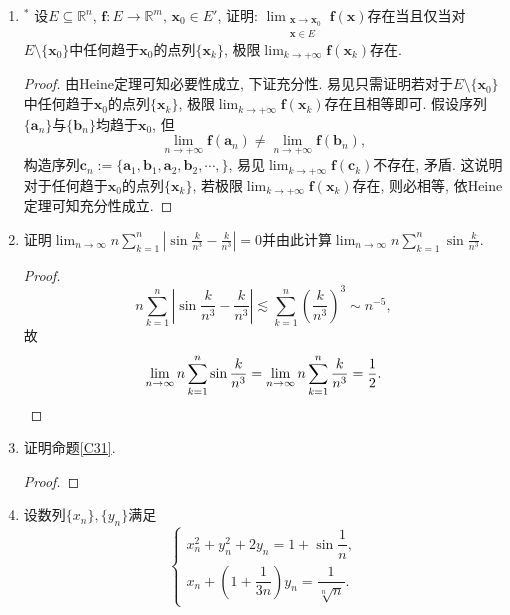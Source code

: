 \begin{1a}
\begin{enumerate}
\item ${}^*$ 设\(E\subseteq\mathbb{R}^n\), \(\boldsymbol{f}:E\rightarrow\mathbb{R}^m,\,\boldsymbol{x}_0\in E'\), 
证明: \(\lim_{\substack{\boldsymbol{x}\rightarrow\boldsymbol{x}_0\\\boldsymbol{x}\in E}}\boldsymbol{f}(\boldsymbol{x})\)存在当且仅当对\(E\setminus\{\boldsymbol{x}_0\}\)中任何趋于\(\boldsymbol{x}_0\)的点列\(\{\boldsymbol{x}_k\}\), 极限\(\lim_{k\rightarrow+\infty}\boldsymbol{f}(\boldsymbol{x}_k)\)存在.
\begin{proof}
由Heine定理可知必要性成立, 下证充分性. 易见只需证明若对于\(E\setminus\{\boldsymbol{x}_0\}\)中任何趋于\(\boldsymbol{x}_0\)的点列\(\{\boldsymbol{x}_k\}\), 
极限\(\lim_{k\rightarrow+\infty}\boldsymbol{f}(\boldsymbol{x}_k)\)存在且相等即可. 
假设序列\(\{\boldsymbol{a}_n\}\)与\(\{\boldsymbol{b}_n\}\)均趋于\(\boldsymbol{x}_0\), 但
\[\lim_{n\rightarrow+\infty}\boldsymbol{f}(\boldsymbol{a}_n)\ne \lim_{n\rightarrow+\infty}\boldsymbol{f}(\boldsymbol{b}_n),\]
构造序列\(\boldsymbol{c}_n:=\{\boldsymbol{a}_1,\boldsymbol{b}_1,\boldsymbol{a}_2,\boldsymbol{b}_2,\cdots,\}\), 
易见\(\lim_{k\rightarrow+\infty}\boldsymbol{f}(\boldsymbol{c}_k)\)不存在, 矛盾. 
这说明对于任何趋于\(\boldsymbol{x}_0\)的点列\(\{\boldsymbol{x}_k\}\), 
若极限\(\lim_{k\rightarrow+\infty}\boldsymbol{f}(\boldsymbol{x}_k)\)存在, 则必相等, 依Heine定理可知充分性成立.
\end{proof}
\item 证明\(\lim_{n\rightarrow\infty}n\sum_{k=1}^{n}\left|\sin\frac{k}{n^3}-\frac{k}{n^3}\right|=0\)并由此计算\(\lim_{n\rightarrow\infty}n\sum_{k=1}^{n}\sin\frac{k}{n^3}\).
\begin{proof}
\[n\sum_{k=1}^{n}\left|\sin\frac{k}{n^3}-\frac{k}{n^3}\right|
\lesssim\sum_{k=1}^{n}\left(\frac{k}{n^3}\right)^3\sim n^{-5},\]
故\[\lim_{n\rightarrow\infty}n\sum_{k=1}^{n}\sin\frac{k}{n^3}
=\lim_{n\rightarrow\infty}n\sum_{k=1}^{n}\frac{k}{n^3}=\frac{1}{2}.\qedhere\]
\end{proof}
\item 证明命题\ref{C31}.
\begin{proof}
\end{proof}
\item 设数列\(\{x_n\},\{y_n\}\)满足\[\begin{cases}
    x_n^2+y_n^2+2y_n=1+\sin\dfrac{1}{n},\\
    x_n+\left(1+\dfrac{1}{3n}\right)y_n=\dfrac{1}{\sqrt[n]{n}}.
\end{cases}\]

\end{enumerate}
\end{1a}
